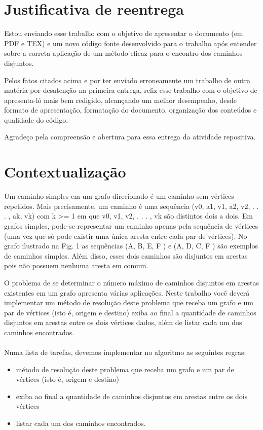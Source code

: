\section{Justificativa de reentrega}

Estou enviando esse trabalho com o objetivo de apresentar o documento (em PDF e TEX) e um novo código fonte desenvolvido para o trabalho após entender sobre a correta aplicação de um método eficaz para o encontro dos caminhos disjuntos.

Pelos fatos citados acima e por ter enviado erroneamente um trabalho de outra matéria por desatenção na primeira entrega, refiz esse trabalho com o objetivo de apresenta-ló mais bem redigido, alcançando um melhor desempenho, desde formato de apresentação, formatação do documento, organização dos conteúdos e qualidade do código.

Agradeço pela compreensão e abertura para essa entrega da atividade repositiva.

\section{Contextualização}

Um caminho simples em um grafo direcionado é um caminho sem vértices repetidos. Mais precisamente, um caminho é uma sequência (v0, a1, v1, a2, v2, . . . , ak, vk) com k >= 1 em que v0, v1, v2, . . . , vk são distintos dois a dois. Em grafos simples, pode-se representar um caminho apenas pela sequência de vértices (uma vez que só pode existir uma única aresta entre cada par de vértices). No grafo ilustrado na Fig. 1 as sequências (A, B, E, F ) e (A, D, C, F ) são exemplos de caminhos simples. Além disso, esses dois caminhos são disjuntos em arestas pois não possuem nenhuma aresta em comum.

O problema de se determinar o número máximo de caminhos disjuntos em arestas existentes em um grafo apresenta várias aplicações. Neste trabalho você deverá implementar um método de resolução deste problema que receba um grafo e um par de vértices (isto é, origem e destino) exiba ao final a quantidade de caminhos disjuntos em arestas entre os dois vértices dados, além de listar cada um dos caminhos encontrados.
\\
\\
Numa lista de tarefas, devemos implementar no algoritmo as seguintes regras:

\begin{itemize}
  \item método de resolução deste problema que receba um grafo e um par de vértices (isto é, origem e destino)
  \item exiba ao final a quantidade de caminhos disjuntos em arestas entre os dois vértices
  \item listar cada um dos caminhos encontrados.
\end{itemize}


